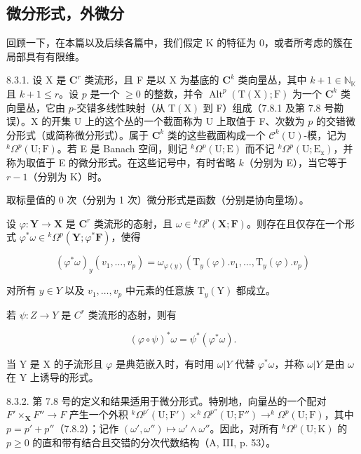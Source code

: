 \subsection{微分形式，外微分}

回顾一下，在本篇以及后续各篇中，我们假定 K 的特征为 0，或者所考虑的簇在局部具有有限维。

8.3.1. 设 X 是 \(\mathbf{C}^r\) 类流形，且 F 是以 X 为基底的 \(\mathbf{C}^k\) 类向量丛，其中 \(k + 1 \in \mathbb{N}_{\mathbb{K}}\) 且 \(k + 1 \leqslant r\)。设 \(p\) 是一个 \(\geqslant 0\) 的整数，并令 \(\operatorname{Alt}^p(\mathrm{T}(\mathrm{X}); \mathrm{F})\) 为一个 \(\mathbf{C}^k\) 类向量丛，它由 \(p\)-交错多线性映射（从 \(\mathrm{T}(\mathrm{X})\) 到 F）组成（7.8.1 及第 7.8 号勘误）。X 的开集 U 上的这个丛的一个截面称为 U 上取值于 F、次数为 \(p\) 的交错微分形式（或简称微分形式）。属于 \(\mathbf{C}^k\) 类的这些截面构成一个 \(\mathcal{C}^k(\mathrm{U})\)-模，记为 \(^k\Omega^p(\mathrm{U}; \mathrm{F})\)。若 E 是 Banach 空间，则记 \(^k\Omega^p(\mathrm{U}; \mathrm{E})\) 而不记 \(^k\Omega^p(\mathrm{U}; \mathrm{E}_{\mathrm{x}})\)，并称为取值于 E 的微分形式。在这些记号中，有时省略 \(k\)（分别为 E），当它等于 \(r - 1\)（分别为 K）时。

取标量值的 0 次（分别为 1 次）微分形式是函数（分别是协向量场）。

设 \(\varphi\colon\mathbf{Y}\to\mathbf{X}\) 是 \(\mathbf{C}^{r}\) 类流形的态射，且 \(\omega\in{}^{k}\Omega^{p}(\mathbf{X};\mathbf{F})\)。则存在且仅存在一个形式 \(\varphi^{*}\omega\in{}^{k}\Omega^{p}(\mathbf{Y};\varphi^{*}\mathbf{F})\)，使得

\[
(\varphi^ {*} \omega) _ {y} (v _ {1}, \dots , v _ {p}) = \omega_ {\varphi (y)} (\mathrm{T} _ {y} (\varphi). v _ {1}, \dots , \mathrm{T} _ {y} (\varphi). v _ {p})\tag{1}
\]

对所有 \(y \in Y\) 以及 \(v_{1}, \ldots, v_{p}\) 中元素的任意族 \(\mathrm{T}_{y}(\mathrm{Y})\) 都成立。

若 \(\psi: Z \to Y\) 是 \(C^r\) 类流形的态射，则有

\[
(\varphi \circ \psi) ^ {*} \omega = \psi^ {*} (\varphi^ {*} \omega).\tag{2}
\]

当 Y 是 X 的子流形且 \(\varphi\) 是典范嵌入时，有时用 \(\omega|Y\) 代替 \(\varphi^{*}\omega\)，并称 \(\omega|Y\) 是由 \(\omega\) 在 Y 上诱导的形式。

8.3.2. 第 7.8 号的定义和结果适用于微分形式。特别地，向量丛的一个配对 \(F' \times_{\mathbf{X}} F'' \to F\) 产生一个外积 \(^k\Omega^{p'}(\mathrm{U};\mathrm{F}') \times ^k\Omega^{p''}(\mathrm{U};\mathrm{F}'') \to ^k\Omega^p(\mathrm{U};\mathrm{F})\)，其中 \(p = p' + p''\)（7.8.2）；记作 \((\omega', \omega'') \mapsto \omega' \wedge \omega''\)。因此，对所有 \(^k\Omega^p(\mathrm{U};\mathrm{K})\) 的 \(p \geqslant 0\) 的直和带有结合且交错的分次代数结构（A, III, p. 53）。

